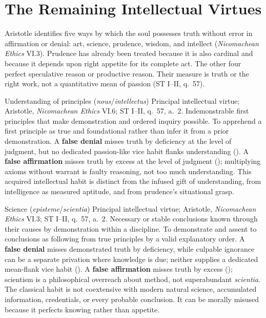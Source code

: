 \section{The Remaining Intellectual Virtues}
\label{sec:intellectual}

Aristotle identifies five ways by which the soul possesses truth without error in affirmation or denial: art, science, prudence, wisdom, and intellect (\emph{Nicomachean Ethics} VI.3). Prudence has already been treated because it is also cardinal and because it depends upon right appetite for its complete act. The other four perfect speculative reason or productive reason. Their measure is truth or the right work, not a quantitative mean of passion (ST I--II, q.~57).

\virtuedossier
  {Understanding of principles (\emph{nous}/\emph{intellectus})}
  {Principal intellectual virtue; Aristotle, \emph{Nicomachean Ethics} VI.6; ST I--II, q.~57, a.~2.}
  {Indemonstrable first principles that make demonstration and ordered inquiry possible.}
  {To apprehend a first principle as true and foundational rather than infer it from a prior demonstration.}
  {A \textbf{false denial} misses truth by deficiency at the level of judgment, but no dedicated passion-like vice habit flanks understanding ().}
  {A \textbf{false affirmation} misses truth by excess at the level of judgment (); multiplying axioms without warrant is faulty reasoning, not too much understanding.}
  {This acquired intellectual habit is distinct from the infused gift of understanding, from intelligence as measured aptitude, and from prudence's situational grasp.}

\virtuedossier
  {Science (\emph{episteme}/\emph{scientia})}
  {Principal intellectual virtue; Aristotle, \emph{Nicomachean Ethics} VI.3; ST I--II, q.~57, a.~2.}
  {Necessary or stable conclusions known through their causes by demonstration within a discipline.}
  {To demonstrate and assent to conclusions as following from true principles by a valid explanatory order.}
  {A \textbf{false denial} misses demonstrated truth by deficiency, while culpable ignorance can be a separate privation where knowledge is due; neither supplies a dedicated mean-flank vice habit ().}
  {A \textbf{false affirmation} misses truth by excess (); scientism is a philosophical overreach about method, not superabundant \emph{scientia}.}
  {The classical habit is not coextensive with modern natural science, accumulated information, credentials, or every probable conclusion. It can be morally misused because it perfects knowing rather than appetite.}

